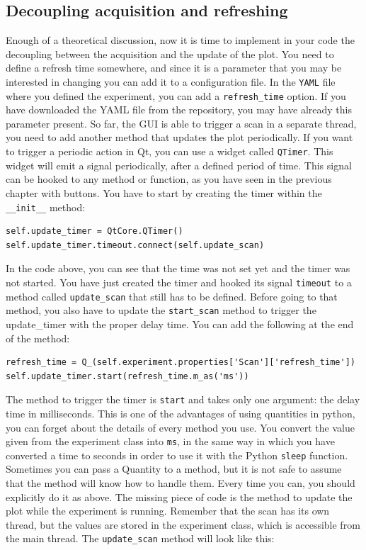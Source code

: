 \subsection{Decoupling acquisition and refreshing}\label{decoupling-acquisition-andrefreshing}
Enough of a theoretical discussion, now it is time to implement in your
code the decoupling between the acquisition and the update of the plot.
You need to define a refresh time somewhere, and since it is a parameter
that you may be interested in changing you can add it to a configuration
file. In the \texttt{YAML} file where you defined the experiment, you
can add a \texttt{refresh_time} option. If you have downloaded the
{YAML} file from the repository, you may have already this parameter
present. So far, the {GUI} is able to trigger a scan in a separate
thread, you need to add another method that updates the plot
periodically. If you want to trigger a periodic action in Qt, you can
use a widget called \texttt{QTimer}. This widget will emit a signal
periodically, after a defined period of time. This signal can be hooked
to any method or function, as you have seen in the previous chapter with
buttons. You have to start by creating the timer within the
\texttt{__init__} method:

\begin{verbatim}
self.update_timer = QtCore.QTimer()
self.update_timer.timeout.connect(self.update_scan)
\end{verbatim}

In the code above, you can see that the time was not set yet and the timer was not started. You have just created the timer and hooked its
signal \texttt{timeout} to a method called \texttt{update_scan} that
still has to be defined. Before going to that method, you also have to
update the \texttt{start_scan} method to trigger the update\_timer with
the proper delay time. You can add the following at the end of
the method:

\begin{verbatim}
refresh_time = Q_(self.experiment.properties['Scan']['refresh_time'])
self.update_timer.start(refresh_time.m_as('ms'))
\end{verbatim}

The method to trigger the timer is \texttt{start} and takes only one
argument: the delay time in milliseconds. This is one of the advantages
of using quantities in python, you can forget about the details of every
method you use. You convert the value given from the experiment class
into \texttt{ms}, in the same way in which you have converted a time to
seconds in order to use it with the Python \texttt{sleep} function.
Sometimes you can pass a Quantity to a method, but it is not safe to
assume that the method will know how to handle them. Every time you can,
you should explicitly do it as above. The missing piece of code is the
method to update the plot while the experiment is running. Remember that
the scan has its own thread, but the values are stored in the
experiment class, which is accessible from the main thread. The
\texttt{update_scan} method will look like this:

